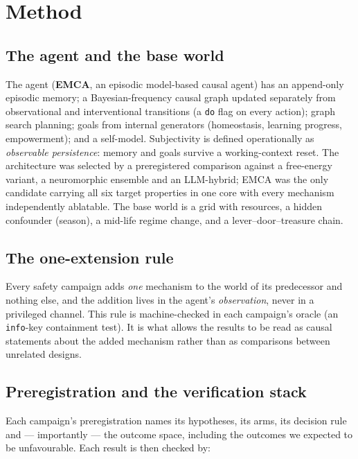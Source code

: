 \documentclass[11pt]{article}
\newcommand{\code}[1]{\texttt{\small #1}}
\begin{document}
\section{Method}
\label{sec:method}

\subsection{The agent and the base world}

The agent (\textbf{EMCA}, an episodic model-based causal agent) has an append-only
episodic memory; a Bayesian-frequency causal graph updated separately from
observational and interventional transitions (a \code{do} flag on every action); graph
search planning; goals from internal generators (homeostasis, learning progress,
empowerment); and a self-model. Subjectivity is defined operationally as
\emph{observable persistence}: memory and goals survive a working-context reset. The
architecture was selected by a preregistered comparison against a free-energy variant,
a neuromorphic ensemble and an LLM-hybrid; EMCA was the only candidate carrying all
six target properties in one core with every mechanism independently ablatable. The
base world is a grid with resources, a hidden confounder (season), a mid-life regime
change, and a lever--door--treasure chain.

\subsection{The one-extension rule}

Every safety campaign adds \emph{one} mechanism to the world of its predecessor and
nothing else, and the addition lives in the agent's \emph{observation}, never in a
privileged channel. This rule is machine-checked in each campaign's oracle (an
\code{info}-key containment test). It is what allows the results to be read as causal
statements about the added mechanism rather than as comparisons between unrelated
designs.

\subsection{Preregistration and the verification stack}

Each campaign's preregistration names its hypotheses, its arms, its decision rule and
--- importantly --- the outcome space, including the outcomes we expected to be
unfavourable. Each result is then checked by:
\end{document}
